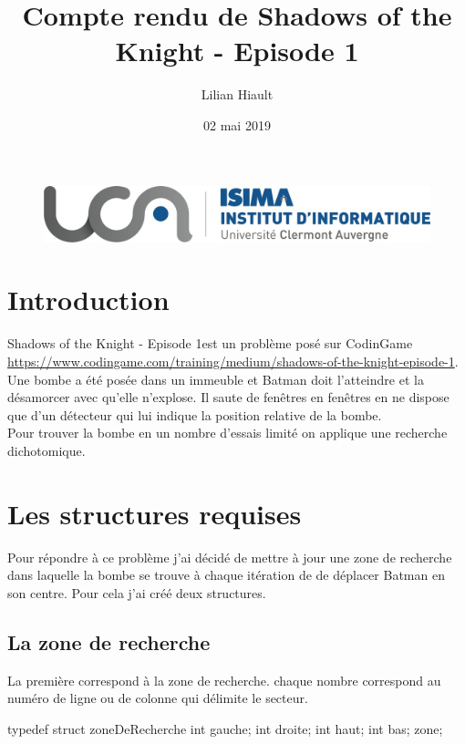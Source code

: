 \documentclass{article}
\title{Compte rendu de Shadows of the Knight - Episode 1}
\author{Lilian Hiault}
\date{02 mai 2019}
\begin{document}
\begin{figure}
  \centerline{\includegraphics[scale=0.2]{logo-isima.jpeg}}
\end{figure}

\maketitle

\tableofcontents

\section*{Introduction}

\og Shadows of the Knight - Episode 1\fg est un problème posé sur CodinGame \url{https://www.codingame.com/training/medium/shadows-of-the-knight-episode-1}. Une bombe a été posée dans un immeuble et Batman doit l'atteindre et la désamorcer avec qu'elle n'explose. Il saute de fenêtres en fenêtres en ne dispose que d'un détecteur qui lui indique la position relative de la bombe. \\
Pour trouver la bombe en un nombre d'essais limité on applique une recherche dichotomique.

\section{Les structures requises}

Pour répondre à ce problème j'ai décidé de mettre à jour une zone de recherche dans laquelle la bombe se trouve à chaque itération de de déplacer Batman en son centre. Pour cela j'ai créé deux structures. \\

\subsection{La zone de recherche}
La première correspond à la zone de recherche. chaque nombre correspond au numéro de ligne ou de colonne qui délimite le secteur.
\\

\begin{boxedverbatim}
typedef struct zoneDeRecherche
{
  int gauche;
  int droite;
  int haut;
  int bas;
} zone;
\end{boxedverbatim}
\end{document}
